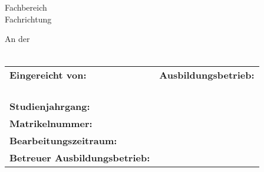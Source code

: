 \begin{titlepage}

	\thispagestyle{plain}

	\begin{figure}[H]
		\begin{flushright}
		\end{flushright}
	\end{figure}
	\vspace{-5pt}
	\begin{center}
		\vspace{2cm}
		\begin{LARGE}
			\art
			\\
			\vspace{16pt}
		\end{LARGE}
		\begin{Huge}
			\titel
			\\
			\vspace{14pt}
		\end{Huge}
		\begin{LARGE}
			\untertitel
		\end{LARGE}
	\end{center}

	\begin{center}
		Fachbereich \studienfach\\
		Fachrichtung \fachrichtung

		An der \hochschule \\ \campus\\
	\end{center}

	\let\stretchbuffer\arraystretch %
	\renewcommand{\arraystretch}{1.25} %
	\begin{table}[b!]
		\normalsize
		\begin{tabularx}{\textwidth}{lX}
			\textbf{Eingereicht von:}             & \textbf{Ausbildungsbetrieb:} \\
			\autor                                & \firma                       \\
			\strassehausnr                        & \firmenstrasse               \\
			\plzwohnort                           & \firmenort                   \\
			\\[1cm]
			\textbf{Studienjahrgang:}             & \jahrgang                    \\
			\textbf{Matrikelnummer:}              & \matrikelnr                  \\
			\textbf{Bearbeitungszeitraum:}        & \bearbeitungszeitraum        \\[0.5cm]
			\textbf{Betreuer Ausbildungsbetrieb:} & \betreuer
		\end{tabularx}
	\end{table}
	\renewcommand{\arraystretch}{\stretchbuffer} %
	\clearpage
\end{titlepage}